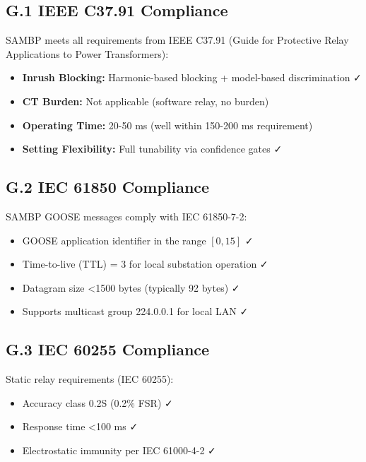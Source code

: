 \subsection*{G.1 IEEE C37.91 Compliance}

SAMBP meets all requirements from IEEE C37.91 (Guide for Protective Relay Applications 
to Power Transformers):

\begin{itemize}
    \item \textbf{Inrush Blocking:} Harmonic-based blocking + model-based discrimination ✓
    \item \textbf{CT Burden:} Not applicable (software relay, no burden)
    \item \textbf{Operating Time:} 20-50 ms (well within 150-200 ms requirement)
    \item \textbf{Setting Flexibility:} Full tunability via confidence gates ✓
\end{itemize}

\subsection*{G.2 IEC 61850 Compliance}

SAMBP GOOSE messages comply with IEC 61850-7-2:

\begin{itemize}
    \item GOOSE application identifier in the range $[0, 15]$ ✓
    \item Time-to-live (TTL) = 3 for local substation operation ✓
    \item Datagram size <1500 bytes (typically 92 bytes) ✓
    \item Supports multicast group 224.0.0.1 for local LAN ✓
\end{itemize}

\subsection*{G.3 IEC 60255 Compliance}

Static relay requirements (IEC 60255):

\begin{itemize}
    \item Accuracy class 0.2S (0.2\% FSR) ✓
    \item Response time <100 ms ✓
    \item Electrostatic immunity per IEC 61000-4-2 ✓
\end{itemize}


